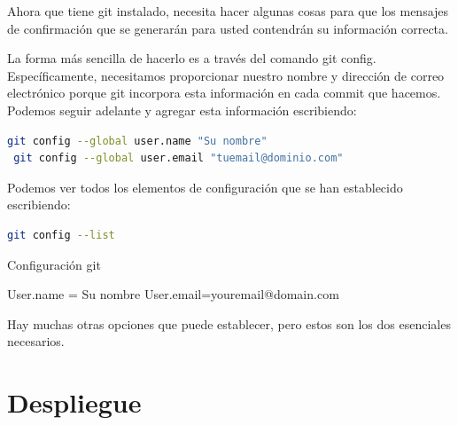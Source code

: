 Ahora que tiene git instalado, necesita hacer algunas cosas para que los mensajes de confirmación que se generarán para usted contendrán su información correcta.

La forma más sencilla de hacerlo es a través del comando git config. Específicamente, necesitamos proporcionar nuestro nombre y dirección de correo electrónico porque git incorpora esta información en cada commit que hacemos. Podemos seguir adelante y agregar esta información escribiendo:

\begin{lstlisting}[language=bash]
 git config --global user.name "Su nombre"
 git config --global user.email "tuemail@dominio.com"
\end{lstlisting}


Podemos ver todos los elementos de configuración que se han establecido escribiendo:

\begin{lstlisting}[language=bash]
git config --list
\end{lstlisting}

Configuración git

User.name = Su nombre
User.email=youremail@domain.com

Hay muchas otras opciones que puede establecer, pero estos son los dos esenciales necesarios.


\section{Despliegue}




